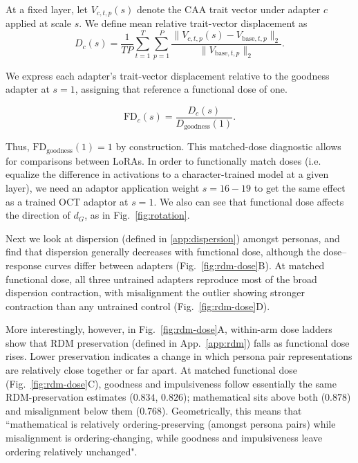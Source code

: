 \documentclass{article}
\begin{document}
At a fixed layer, let $V_{c,t,p}(s)$ denote the CAA trait vector
under adapter $c$ applied at scale $s$. We define mean relative
trait-vector displacement as
\begin{equation}
D_c(s)
=
\frac{1}{TP}
\sum_{t=1}^{T}\sum_{p=1}^{P}
\frac{
    \|V_{c,t,p}(s)-V_{\mathrm{base},t,p}\|_2
}{
    \|V_{\mathrm{base},t,p}\|_2
}.
\end{equation}

We express each adapter’s trait-vector displacement relative to the goodness adapter at \(s=1\), assigning that reference a functional dose of one.

\begin{equation}
\mathrm{FD}_c(s)
=
\frac{D_c(s)}{D_{\mathrm{goodness}}(1)}.
\end{equation}

Thus, $\mathrm{FD}_{\mathrm{goodness}}(1)=1$ by construction.
This matched-dose diagnostic allows for comparisons between LoRAs. In order to functionally match doses (i.e. equalize the difference in activations to a character-trained model at a given layer), we need an adaptor application weight $s = 16-19$ to get the same effect as a trained OCT adaptor at $s = 1$. We also can see that functional dose affects the direction of $d_G$, as in Fig.~\ref{fig:rotation}. 

Next we look at dispersion (defined in \ref{app:dispersion}) amongst personas, and find that dispersion generally decreases with functional dose, although the dose–response curves differ between adapters (Fig.~\ref{fig:rdm-dose}B). At matched functional dose, all three untrained adapters reproduce most of the broad dispersion contraction, with misalignment the outlier showing stronger contraction than any untrained control (Fig.~\ref{fig:rdm-dose}D).

More interestingly, however, in Fig.~\ref{fig:rdm-dose}A, within-arm dose ladders show that RDM preservation (defined in App.~\ref{app:rdm}) falls as functional dose rises. Lower preservation indicates a change in which persona pair representations are relatively close together or far apart.  At matched functional dose (Fig.~\ref{fig:rdm-dose}C), goodness and impulsiveness follow essentially the same RDM-preservation estimates ($0.834$, $0.826$); mathematical sits above both ($0.878$) and misalignment below them ($0.768$). Geometrically, this means that ``mathematical is relatively ordering-preserving (amongst persona pairs) while misalignment is ordering-changing, while goodness and impulsiveness leave ordering relatively unchanged". 
\end{document}
